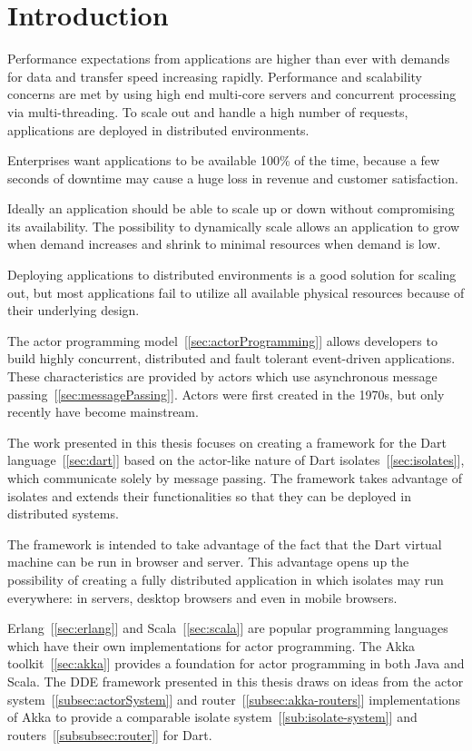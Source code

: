 \chapter{Introduction}\label{chapter:introduction}
  Performance expectations from applications are higher than ever with demands for data and transfer speed increasing rapidly. Performance and scalability concerns are met by using high end multi-core servers and concurrent processing via multi-threading. To scale out and handle a high number of requests, applications are deployed in distributed environments.

  Enterprises want applications to be available 100\% of the time, because a few seconds of downtime may cause a huge loss in revenue and customer satisfaction.

  Ideally an application should be able to scale up or down without compromising its availability. The possibility to dynamically scale allows an application to grow when demand increases and shrink to minimal resources when demand is low.

  Deploying applications to distributed environments is a good solution for scaling out, but most applications fail to utilize all available physical resources because of their underlying design.

  The actor programming model~[\autoref{sec:actorProgramming}] allows developers to build highly concurrent, distributed and fault tolerant event-driven applications. These characteristics are provided by actors which use asynchronous message passing~[\autoref{sec:messagePassing}]. Actors were first created in the 1970s, but only recently have become mainstream.

  The work presented in this thesis focuses on creating a framework for the Dart language~[\autoref{sec:dart}] based on the actor-like nature of Dart isolates~[\autoref{sec:isolates}], which communicate solely by message passing. The framework takes advantage of isolates and extends their functionalities so that they can be deployed in distributed systems.

  The framework is intended to take advantage of the fact that the Dart virtual machine can be run in browser and server. This advantage opens up the possibility of creating a fully distributed application in which isolates may run everywhere: in servers, desktop browsers and even in mobile browsers.

  Erlang~[\autoref{sec:erlang}] and Scala~[\autoref{sec:scala}] are popular programming languages which have their own implementations for actor programming. The Akka toolkit~[\autoref{sec:akka}] provides a foundation for actor programming in both Java and Scala. The \acrshort{DDE} framework presented in this thesis draws on ideas from the actor system~[\autoref{subsec:actorSystem}] and router~[\autoref{subsec:akka-routers}]
   implementations of Akka to provide a comparable isolate system~[\autoref{sub:isolate-system}] and routers~[\autoref{subsubsec:router}] for Dart.

